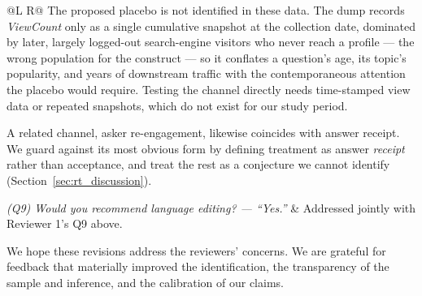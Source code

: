 \documentclass[11pt]{article}
\begin{document}
\begin{longtable}{@{}L R@{}}
The proposed placebo is not identified in these data. The dump records \textit{ViewCount} only as a single cumulative snapshot at the collection date, dominated by later, largely logged-out search-engine visitors who never reach a profile --- the wrong population for the construct --- so it conflates a question's age, its topic's popularity, and years of downstream traffic with the contemporaneous attention the placebo would require. Testing the channel directly needs time-stamped view data or repeated snapshots, which do not exist for our study period.

A related channel, asker re-engagement, likewise coincides with answer receipt. We guard against its most obvious form by defining treatment as answer \emph{receipt} rather than acceptance, and treat the rest as a conjecture we cannot identify (Section~\ref{sec:rt_discussion}). \\
\midrule

\textit{(Q9) Would you recommend language editing? --- ``Yes.''} &
Addressed jointly with Reviewer 1's Q9 above. \\

\end{longtable}

We hope these revisions address the reviewers' concerns. We are grateful for feedback that materially improved the identification, the transparency of the sample and inference, and the calibration of our claims.
\end{document}
